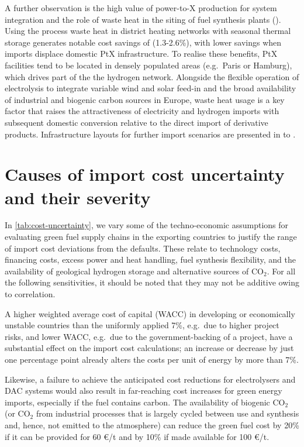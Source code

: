 
A further observation is the high value of power-to-X production for system integration and the role of waste heat in the siting of fuel synthesis plants (). Using the process waste heat in district heating networks with seasonal thermal storage generates notable cost savings of  (1.3-2.6\%), with lower savings when imports displace domestic PtX infrastructure. To realise these benefits, PtX facilities tend to be located in densely populated areas (e.g.~Paris or Hamburg), which drives part of the the hydrogen network. Alongside the flexible operation of electrolysis to integrate variable wind and solar feed-in and the broad availability of industrial and biogenic carbon sources in Europe, waste heat usage is a key factor that raises the attractiveness of electricity and hydrogen imports with subsequent domestic conversion relative to the direct import of derivative products. Infrastructure layouts for further import scenarios are presented in  to .

\section*{Causes of import cost uncertainty and their severity}

In \cref{tab:cost-uncertainty}, we vary some of the techno-economic assumptions
for evaluating green fuel supply chains in the exporting countries to justify
the range of import cost deviations from the defaults. These relate to
technology costs, financing costs, excess power and heat handling, fuel
synthesis flexibility, and the availability of geological hydrogen storage and
alternative sources of CO$_2$. For all the following sensitivities, it should be
noted that they may not be additive owing to correlation.

A higher weighted average cost of capital (WACC) in developing or economically
unstable countries than the uniformly applied 7\%, e.g.~due to higher project
risks, and lower WACC, e.g.~due to the government-backing of a project, have a
substantial effect on the import cost calculations; an increase or decrease by
just one percentage point already alters the costs per unit of energy by more
than
7\%.\cite{egliBiasEnergy2019,bogdanovReplyBias2019,lonerganImprovingRepresentation2023a,schyskaHowRegional2020,steffenDeterminantsCost2022}

Likewise, a failure to achieve the anticipated cost reductions for electrolysers
and DAC systems would also result in far-reaching cost increases for green
energy imports, especially if the fuel contains carbon. The availability of
biogenic CO$_2$ (or CO$_2$ from industrial processes that is largely cycled
between use and synthesis and, hence, not emitted to the atmosphere) can reduce
the green fuel cost by 20\% if it can be provided for 60 \euro{}/t and by 10\%
if made available for 100 \euro{}/t.

